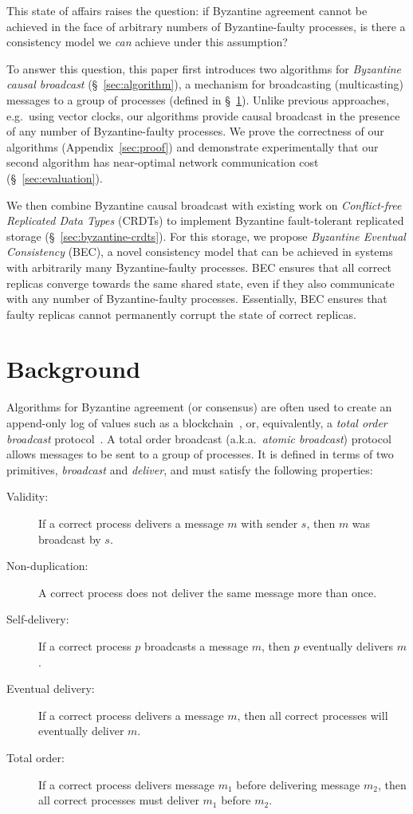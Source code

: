 \documentclass[a4paper,anonymous,USenglish]{lipics-v2019}
\begin{document}
This state of affairs raises the question: if Byzantine agreement cannot be achieved in the face of arbitrary numbers of Byzantine-faulty processes, is there a consistency model we \emph{can} achieve under this assumption?

To answer this question, this paper first introduces two algorithms for \emph{Byzantine causal broadcast} (\S~\ref{sec:algorithm}), a mechanism for broadcasting (multicasting) messages to a group of processes (defined in \S~\ref{sec:background}).
Unlike previous approaches, e.g.\ using vector clocks, our algorithms provide causal broadcast in the presence of any number of Byzantine-faulty processes.
We prove the correctness of our algorithms (Appendix~\ref{sec:proof}) and demonstrate experimentally that our second algorithm has near-optimal network communication cost (\S~\ref{sec:evaluation}).

We then combine Byzantine causal broadcast with existing work on \emph{Conflict-free Replicated Data Types} (CRDTs) to implement Byzantine fault-tolerant replicated storage  (\S~\ref{sec:byzantine-crdts}).
For this storage, we propose \emph{Byzantine Eventual Consistency} (BEC), a novel consistency model that can be achieved in systems with arbitrarily many Byzantine-faulty processes.
BEC ensures that all correct replicas converge towards the same shared state, even if they also communicate with any number of Byzantine-faulty processes.
Essentially, BEC ensures that faulty replicas cannot permanently corrupt the state of correct replicas.

\section{Background}\label{sec:background}

Algorithms for Byzantine agreement (or consensus) are often used to create an append-only log of values such as a blockchain~\cite{Bano:2019}, or, equivalently, a \emph{total order broadcast} protocol~\cite{Cachin:2011wt,Defago:2004ji}.
A total order broadcast (a.k.a.\ \emph{atomic broadcast}) protocol allows messages to be sent to a group of processes.
It is defined in terms of two primitives, \emph{broadcast} and \emph{deliver}, and must satisfy the following properties:

\begin{description}
\item[Validity:] If a correct process delivers a message $m$ with sender $s$, then $m$ was broadcast by $s$.
\item[Non-duplication:] A correct process does not deliver the same message more than once.
\item[Self-delivery:] If a correct process $p$ broadcasts a message $m$, then $p$ eventually delivers $m$.
\item[Eventual delivery:] If a correct process delivers a message $m$, then all correct processes will eventually deliver $m$.
\item[Total order:] If a correct process delivers message $m_1$ before delivering message $m_2$, then all correct processes must deliver $m_1$ before $m_2$.
\end{description}
\end{document}
